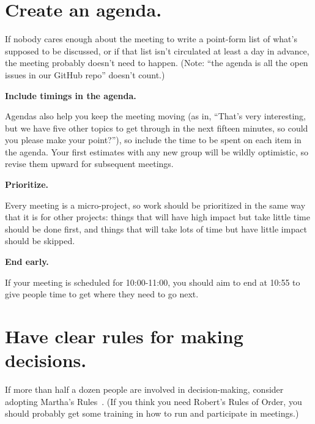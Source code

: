 \documentclass[10pt,letterpaper]{article}
\newcommand{\rulemajor}[1]{\section{#1}}
\begin{document}
\rulemajor{Create an agenda.}

If nobody cares enough about the meeting to write a point-form list of what's
supposed to be discussed, or if that list isn't circulated at least a day in
advance, the meeting probably doesn't need to happen.  (Note: ``the agenda is
all the open issues in our GitHub repo'' doesn't count.)

\textbf{Include timings in the agenda.}

Agendas also help you keep the meeting moving (as in, ``That's very interesting,
but we have five other topics to get through in the next fifteen minutes, so
could you please make your point?''), so include the time to be spent on each
item in the agenda.  Your first estimates with any new group will be wildly
optimistic, so revise them upward for subsequent meetings.

\textbf{Prioritize.}

Every meeting is a micro-project, so work should be prioritized in the same way
that it is for other projects: things that will have high impact but take little
time should be done first, and things that will take lots of time but have
little impact should be skipped.

\textbf{End early.}

If your meeting is scheduled for 10:00-11:00, you should aim to end at 10:55 to
give people time to get where they need to go next.

\rulemajor{Have clear rules for making decisions.}

If more than half a dozen people are involved in decision-making, consider
adopting Martha's Rules~\cite{Minahan1986}.  (If you think you need Robert's
Rules of Order, you should probably get some training in how to run and
participate in meetings.)
\end{document}
